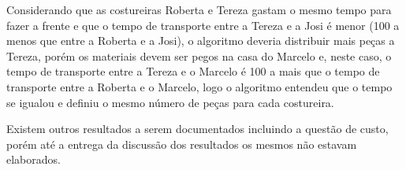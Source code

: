 \par Considerando que as costureiras Roberta e Tereza gastam o mesmo tempo para fazer a frente e que o tempo de transporte 
entre a Tereza e a Josi é menor (100 a menos que entre a Roberta e a Josi), o algoritmo deveria distribuir mais peças a Tereza,
porém os materiais devem ser pegos na casa do Marcelo e, neste caso, o tempo de transporte entre a Tereza e o Marcelo é 100 
a mais que o tempo de transporte entre a Roberta e o Marcelo, logo o algoritmo entendeu que o tempo se igualou e definiu
o mesmo número de peças para cada costureira.

\par Existem outros resultados a serem documentados incluindo a questão de custo, porém até a entrega da discussão dos resultados
os mesmos não estavam elaborados.
